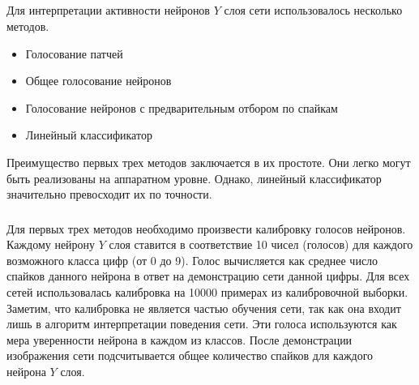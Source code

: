 \documentclass[a4paper]{article}
\begin{document}
\subsection{}

Для интерпретации активности нейронов $Y$ слоя сети использовалось несколько методов.

\begin{itemize}
 \item Голосование патчей
 \item Общее голосование нейронов
 \item Голосование нейронов с предварительным отбором по спайкам
 \item Линейный классификатор
\end{itemize}

Преимущество первых трех методов заключается в их простоте. Они легко могут быть реализованы на аппаратном уровне. Однако, линейный классификатор значительно превосходит их по точности.\\

\subsubsection{} \label{calibration}
Для первых трех методов необходимо произвести калибровку голосов нейронов. Каждому нейрону $Y$ слоя ставится в соответствие 10 чисел (голосов) для каждого возможного класса цифр (от 0 до 9). Голос вычисляется как среднее число спайков данного нейрона в ответ на демонстрацию сети данной цифры. Для всех сетей использовалась калибровка на 10000 примерах из калибровочной выборки. Заметим, что калибровка не является частью обучения сети, так как она входит лишь в алгоритм интерпретации поведения сети. Эти голоса используются как мера уверенности нейрона в каждом из классов. После демонстрации изображения сети подсчитывается общее количество спайков для каждого нейрона $Y$ слоя.
\end{document}
